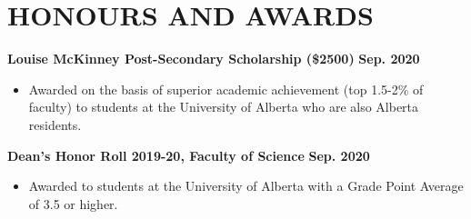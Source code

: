 \documentclass{article}
\begin{document}
\section*{\textcolor{my_colour}{HONOURS AND AWARDS}}
\vspace{-.25em} \hrulefill \vspace{.75em}

\textbf{Louise McKinney Post-Secondary Scholarship (\$2500)} \hfill \textbf{Sep. 2020}
\begin{itemize}
    \item Awarded on the basis of superior academic achievement (top 1.5-2\% of faculty) to students at the University of Alberta who are also Alberta residents.
\end{itemize}

\textbf{Dean's Honor Roll 2019-20, Faculty of Science} \hfill \textbf{Sep. 2020}
\begin{itemize}
    \item Awarded to students at the University of Alberta with a Grade Point Average of 3.5 or higher.
\end{itemize}
\end{document}
